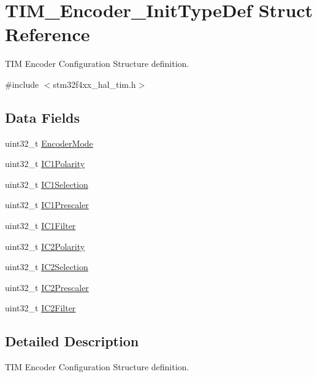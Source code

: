 \hypertarget{struct_t_i_m___encoder___init_type_def}{}\section{T\+I\+M\+\_\+\+Encoder\+\_\+\+Init\+Type\+Def Struct Reference}
\label{struct_t_i_m___encoder___init_type_def}


T\+IM Encoder Configuration Structure definition.  




{\ttfamily \#include $<$stm32f4xx\+\_\+hal\+\_\+tim.\+h$>$}

\subsection*{Data Fields}
\begin{DoxyCompactItemize}
\item 
uint32\+\_\+t \hyperlink{struct_t_i_m___encoder___init_type_def_ab1e4b0752d88c04081e3ff2fea6aa52e}{Encoder\+Mode}
\item 
uint32\+\_\+t \hyperlink{struct_t_i_m___encoder___init_type_def_a3e27323d593e4f3b95ebaa3772e79618}{I\+C1\+Polarity}
\item 
uint32\+\_\+t \hyperlink{struct_t_i_m___encoder___init_type_def_a85fbdebacff594ff1ad0d16eddfdc179}{I\+C1\+Selection}
\item 
uint32\+\_\+t \hyperlink{struct_t_i_m___encoder___init_type_def_a56307eb4766e3f0e1cd1cd3c4fc2157e}{I\+C1\+Prescaler}
\item 
uint32\+\_\+t \hyperlink{struct_t_i_m___encoder___init_type_def_a50f3051c1b568b9dcde146199f97f3fb}{I\+C1\+Filter}
\item 
uint32\+\_\+t \hyperlink{struct_t_i_m___encoder___init_type_def_abb7968a8ba34e13da1fb8f5916a754ce}{I\+C2\+Polarity}
\item 
uint32\+\_\+t \hyperlink{struct_t_i_m___encoder___init_type_def_a84a39a8667f296b4b3fbe1a0add58396}{I\+C2\+Selection}
\item 
uint32\+\_\+t \hyperlink{struct_t_i_m___encoder___init_type_def_ac80972d0e157508ff075815da58070cb}{I\+C2\+Prescaler}
\item 
uint32\+\_\+t \hyperlink{struct_t_i_m___encoder___init_type_def_a30cdb580735007aa9735b2f5cc133049}{I\+C2\+Filter}
\end{DoxyCompactItemize}


\subsection{Detailed Description}
T\+IM Encoder Configuration Structure definition. 

